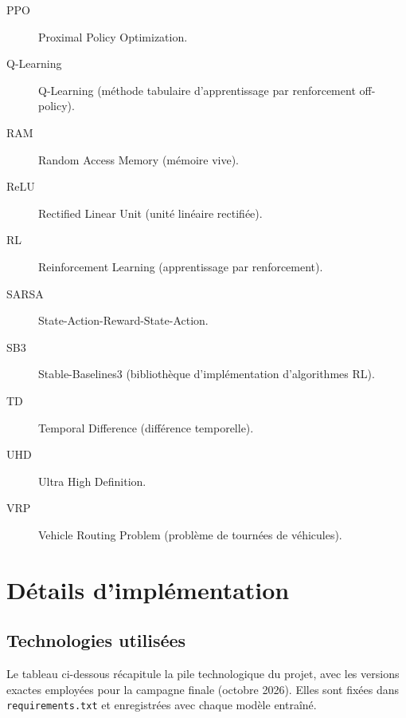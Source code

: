 \documentclass[11pt,a4paper]{report}
\begin{document}
\begin{description}
    \item[PPO] Proximal Policy Optimization.
    \item[Q-Learning] Q-Learning (méthode tabulaire d'apprentissage par renforcement off-policy).
    \item[RAM] Random Access Memory (mémoire vive).
    \item[ReLU] Rectified Linear Unit (unité linéaire rectifiée).
    \item[RL] Reinforcement Learning (apprentissage par renforcement).
    \item[SARSA] State-Action-Reward-State-Action.
    \item[SB3] Stable-Baselines3 (bibliothèque d’implémentation d’algorithmes RL).
    \item[TD] Temporal Difference (différence temporelle).
    \item[UHD] Ultra High Definition.
    \item[VRP] Vehicle Routing Problem (problème de tournées de véhicules).
\end{description}

\newpage




\appendix
{}

\chapter{Détails d'implémentation}
\label{ann:implementation}

\section*{Technologies utilisées}

Le tableau ci-dessous r\'ecapitule la pile technologique du projet, avec les versions exactes employ\'ees pour la campagne finale (octobre 2026). Elles sont fix\'ees dans \texttt{requirements.txt} et enregistr\'ees avec chaque mod\`ele entra\^in\'e.
\end{document}
